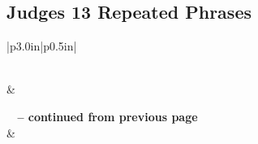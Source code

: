 \subsection{Judges 13 Repeated Phrases}


\normalsize
 
\begin{center}
\begin{longtable}{|p{3.0in}|p{0.5in}|}
\caption[Judges 13 Repeated Phrases]{Judges 13 Repeated Phrases}\label{table:Repeated Phrases Judges 13} \\
\hline {} &  \\ \hline 
\endfirsthead
 
{{\bfseries \tablename\ \thetable{} -- continued from previous page}} \\  
\hline {} &  \\ \hline 
\endhead
 

\end{longtable}
\end{center}
